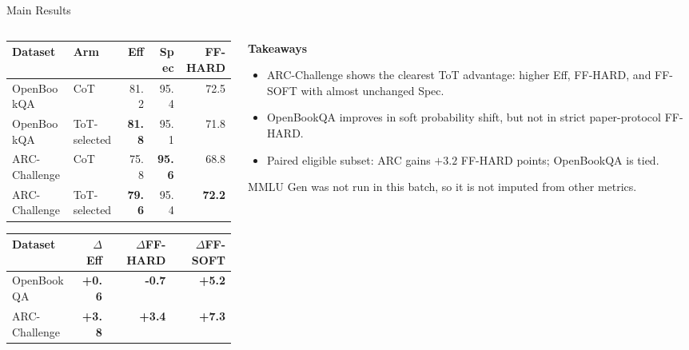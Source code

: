 \documentclass[aspectratio=169,10pt]{beamer}
\newcommand{\gain}[1]{\textcolor{accentgreen}{\textbf{#1}}}
\newcommand{\loss}[1]{\textcolor{accentred}{\textbf{#1}}}
\begin{document}
\begin{frame}{Main Results}
\small
\begin{columns}[T,onlytextwidth]
  \begin{column}{0.61\textwidth}
    \centering
    \scriptsize
    \renewcommand{\arraystretch}{1.15}
    \begin{tabularx}{\linewidth}{X l r r r}
      \toprule
      Dataset & Arm & Eff & Spec & FF-HARD \\
      \midrule
      OpenBookQA & CoT & 81.2 & 95.4 & 72.5 \\
      OpenBookQA & ToT-selected & \gain{81.8} & 95.1 & 71.8 \\
      \midrule
      ARC-Challenge & CoT & 75.8 & \gain{95.6} & 68.8 \\
      ARC-Challenge & ToT-selected & \gain{79.6} & 95.4 & \gain{72.2} \\
      \bottomrule
    \end{tabularx}

    \vspace{0.7em}
    \scriptsize
    \begin{tabularx}{\linewidth}{X r r r}
      \toprule
      Dataset & $\Delta$Eff & $\Delta$FF-HARD & $\Delta$FF-SOFT \\
      \midrule
      OpenBookQA & \gain{+0.6} & \loss{-0.7} & \gain{+5.2} \\
      ARC-Challenge & \gain{+3.8} & \gain{+3.4} & \gain{+7.3} \\
      \bottomrule
    \end{tabularx}
  \end{column}

  \begin{column}{0.35\textwidth}
    \textbf{Takeaways}
    \begin{itemize}
      \item ARC-Challenge shows the clearest ToT advantage:
      higher Eff, FF-HARD, and FF-SOFT with almost unchanged Spec.
      \item OpenBookQA improves in soft probability shift, but not in
      strict paper-protocol FF-HARD.
      \item Paired eligible subset: ARC gains \(+3.2\) FF-HARD points;
      OpenBookQA is tied.
    \end{itemize}

    \vspace{0.4em}
    \scriptsize
    MMLU Gen was not run in this batch, so it is not imputed from other metrics.
  \end{column}
\end{columns}
\end{frame}
\end{document}
